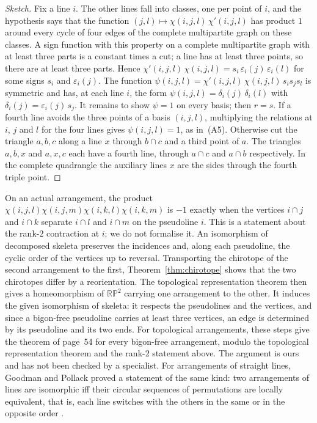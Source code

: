 \documentclass[11pt,a4paper]{amsart}
\theoremstyle{definition}
\theoremstyle{remark}
\newcommand{\PP}{\mathbb{RP}^2}
\begin{document}
\begin{proof}[Sketch]
Fix a line $i$. The other lines fall into classes, one per point of $i$, and the hypothesis says that the function $(j, l) \mapsto \chi(i,j,l)\,\chi'(i,j,l)$ has product $1$ around every cycle of four edges of the complete multipartite graph on these classes. A sign function with this property on a complete multipartite graph with at least three parts is a constant times a cut; a line has at least three points, so there are at least three parts. Hence $\chi'(i,j,l)\,\chi(i,j,l) = s_i\,\varepsilon_i(j)\,\varepsilon_i(l)$ for some signs $s_i$ and $\varepsilon_i(j)$. The function $\psi(i,j,l) = \chi'(i,j,l)\,\chi(i,j,l)\,s_i s_j s_l$ is symmetric and has, at each line $i$, the form $\psi(i, j, l) = \delta_i(j)\,\delta_i(l)$ with $\delta_i(j) = \varepsilon_i(j)\,s_j$. It remains to show $\psi = 1$ on every basis; then $r = s$. If a fourth line avoids the three points of a basis $(i, j, l)$, multiplying the relations at $i$, $j$ and $l$ for the four lines gives $\psi(i,j,l) = 1$, as in~(A5). Otherwise cut the triangle $a, b, c$ along a line $x$ through $b \cap c$ and a third point of $a$. The triangles $a, b, x$ and $a, x, c$ each have a fourth line, through $a \cap c$ and $a \cap b$ respectively. In the complete quadrangle the auxiliary lines $x$ are the sides through the fourth triple point.
\end{proof}

On an actual arrangement, the product $\chi(i,j,l)\chi(i,j,m)\chi(i,k,l)\chi(i,k,m)$ is $-1$ exactly when the vertices $i \cap j$ and $i \cap k$ separate $i \cap l$ and $i \cap m$ on the pseudoline $i$. This is a statement about the rank-$2$ contraction at $i$; we do not formalise it. An isomorphism of decomposed skeleta preserves the incidences and, along each pseudoline, the cyclic order of the vertices up to reversal. Transporting the chirotope of the second arrangement to the first, Theorem~\ref{thm:chirotope} shows that the two chirotopes differ by a reorientation. The topological representation theorem \cite{folkmanlawrence1978} then gives a homeomorphism of $\PP$ carrying one arrangement to the other. It induces the given isomorphism of skeleta: it respects the pseudolines and the vertices, and since a bigon-free pseudoline carries at least three vertices, an edge is determined by its pseudoline and its two ends. For topological arrangements, these steps give the theorem of page~54 for every bigon-free arrangement, modulo the topological representation theorem and the rank-$2$ statement above. The argument is ours and has not been checked by a specialist. For arrangements of straight lines, Goodman and Pollack proved a statement of the same kind: two arrangements of lines are isomorphic iff their circular sequences of permutations are locally equivalent, that is, each line switches with the others in the same or in the opposite order \cite[Th.~5.2.2]{felsnergoodman2017}.
\end{document}
